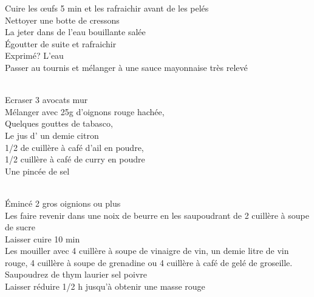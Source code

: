 \begin{minipage}[c]{\textwidth}
Cuire les œufs 5 min et les rafraichir avant de les pelés\\
Nettoyer une botte de cressons\\
La jeter dans de l'eau bouillante salée\\
Égoutter de suite et rafraichir\\
Exprimé? L’eau \\
Passer au tournis et mélanger à une sauce mayonnaise très relevé\\
\\

\end{minipage}

\begin{minipage}[c]{\textwidth}
Ecraser 3 avocats mur\\
Mélanger avec 25g d'oignons rouge hachée,\\
Quelques gouttes de tabasco,\\
Le jus d’ un demie citron\\
1/2 de cuillère à café d'ail en poudre,\\
1/2 cuillère à café de curry en poudre\\
Une pincée de sel\\
\\

\end{minipage}

\begin{minipage}[c]{\textwidth}
Émincé 2 gros oignions ou plus\\
Les faire revenir dans une noix de beurre en les saupoudrant de 2 cuillère à soupe de sucre\\
Laisser cuire 10 min\\
Les mouiller avec 4 cuillère à soupe de vinaigre de vin, un demie litre de vin rouge, 4 cuillère à soupe de grenadine ou 4 cuillère à café de gelé de groseille.\\
Saupoudrez de thym laurier sel poivre\\
Laisser réduire 1/2 h jusqu'à obtenir une masse rouge\\
\\

\end{minipage}

